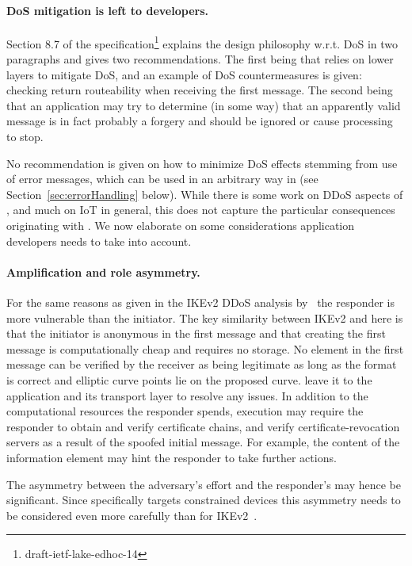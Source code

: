 \documentclass[runningheads]{llncs}
\begin{document}
\paragraph{DoS mitigation is left to developers.}
Section 8.7 of the \mEdhoc{} specification\footnote{draft-ietf-lake-edhoc-14}
explains the design philosophy w.r.t.
DoS in two paragraphs and gives two recommendations.
%
The first being that \mEdhoc{} relies on lower layers to mitigate DoS, and an
example of DoS countermeasures is given: checking return routeability when
receiving the first message.
%
The second being that an application may try to determine (in some way) that an
apparently valid message is in fact probably a forgery and should be ignored or
cause processing to stop.
%

No recommendation is given on how to minimize DoS effects stemming from use of
error messages, which can be used in an arbitrary way in \mEdhoc{}
(see Section~\ref{sec:errorHandling} below).
%
While there is some work on DDoS aspects of \mCoap{}, and much on IoT in
general, this does not capture the particular consequences originating with
\mEdhoc{}.
%
We now elaborate on some considerations application developers needs to take
into account.
%


\paragraph{Amplification and role asymmetry.}
For the same reasons as given in the IKEv2 DDoS analysis
by~\cite{rfc8019} the responder is more vulnerable than the
initiator.
%
The key similarity between IKEv2 and \mEdhoc{} here is that the initiator is
anonymous in the first message and that creating the first message is
computationally cheap and requires no storage.
%
No element in the first \mEdhoc{} message can be verified by the receiver as
being legitimate as long as the format is correct and elliptic curve points
lie on the proposed curve.
%
\mEdhoc{} leave it to the application and its
transport layer to resolve any issues.
%
In addition to the computational resources the responder spends, \mEdhoc{}
execution may require the responder to
obtain and verify certificate chains, and verify
certificate-revocation servers as a result of the spoofed initial message.
%
For example, the content of the \mADone{} information element may hint the
responder to take further actions.
%

The asymmetry between the adversary's effort and the responder's may hence be
significant.
%
Since \mEdhoc{} specifically targets constrained devices this asymmetry needs to
be considered even more carefully than for IKEv2~\cite{rfc8019}.
%
\end{document}
